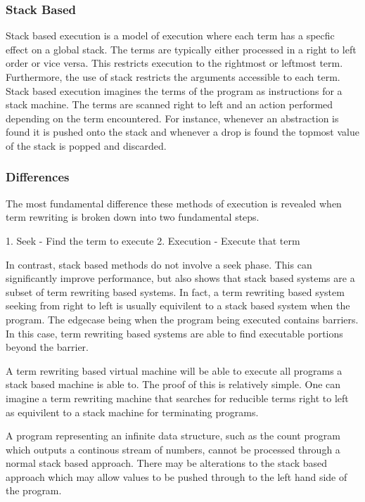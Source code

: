 



\subsubsection{Stack Based}
Stack based execution is a model of execution where each term
has a specfic effect on a global stack. The terms are typically
either processed in a right to left order or vice versa. This
restricts execution to the rightmost or leftmost term. Furthermore,
the use of stack restricts the arguments accessible to each term.
Stack based execution imagines the terms of the program as
instructions for a stack machine. The terms are scanned
right to left and an action performed depending on the term
encountered. For instance, whenever an abstraction is found
it is pushed onto the stack and whenever a drop is found the
topmost value of the stack is popped and discarded.

\subsubsection{Differences}
The most fundamental difference these methods of execution is
revealed when term rewriting is broken down into two fundamental steps.

1. Seek
    - Find the term to execute
2. Execution
    - Execute that term

In contrast, stack based methods do not involve a seek phase. This
can significantly improve performance, but also shows that stack
based systems are a subset of term rewriting based systems. In fact,
a term rewriting based system seeking from right to left is usually 
equivilent to a stack based system when the program. The edgecase
being when the program being executed contains barriers. In this case,
term rewriting based systems are able to find executable portions
beyond the barrier.

A term rewriting based virtual machine will be able to execute
all programs a stack based machine is able to. The proof of this
is relatively simple. One can imagine a term rewriting machine 
that searches for reducible terms right to left as equivilent to
a stack machine for terminating programs.



A program representing an infinite data structure, such as the count
program which outputs a continous stream of numbers, cannot be
processed through a normal stack based approach. There may be alterations
to the stack based approach which may allow values to be pushed 
through to the left hand side of the program.


